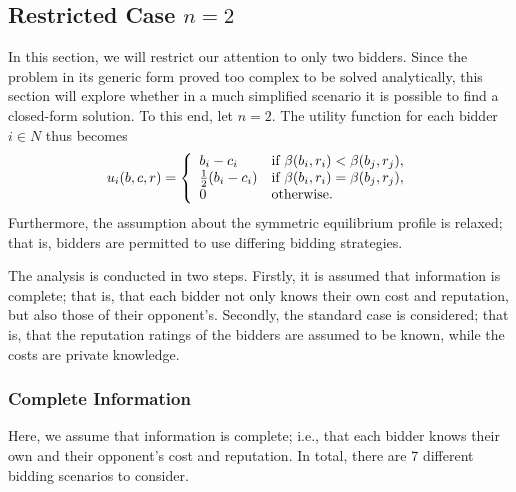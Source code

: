 \subsection{Restricted Case $n=2$} %
\label{sub:direct_restricted_case_n_2_}
In this section, we will restrict our attention to only two bidders. Since the problem in its generic form proved too complex to be solved analytically, this section will explore whether in a much simplified scenario it is possible to find a closed-form solution. To this end, let $n=2$. The utility function for each bidder $i\in N$ thus becomes
\begin{equation}
	\label{eq:utility_n_2}
	u_i(b,c,r) = \left\{
	\begin{array}{l l}
		b_i - c_i &\text{if } \beta(b_i,r_i) < \beta(b_j,r_j),\\
		\frac{1}{2}(b_i - c_i) &\text{if } \beta(b_i,r_i) = \beta(b_j,r_j),\\
		0 &\text{otherwise}.
	\end{array}\right.
\end{equation}
Furthermore, the assumption about the symmetric equilibrium profile is relaxed; that is, bidders are permitted to use differing bidding strategies.

The analysis is conducted in two steps. Firstly, it is assumed that information is complete; that is, that each bidder not only knows their own cost and reputation, but also those of their opponent's. Secondly, the standard case is considered; that is, that the reputation ratings of the bidders are assumed to be known, while the costs are private knowledge.

\subsubsection{Complete Information} %
\label{ssub:complete_information_n_2}
Here, we assume that information is complete; i.e., that each bidder knows their own and their opponent's cost and reputation. In total, there are 7 different bidding scenarios to consider.


